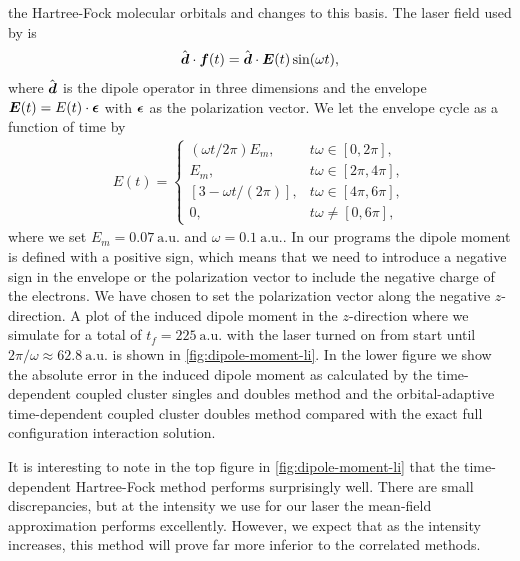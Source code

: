             the Hartree-Fock molecular orbitals and changes to this basis.
            The laser field used by \citeauthor{li_2005} is
            \begin{align}
                \hat{\boldsymbol{d}} \cdot \boldsymbol{f}(t)
                = \hat{\boldsymbol{d}} \cdot \boldsymbol{E}(t)\sin(\omega t),
            \end{align}
            where $\hat{\boldsymbol{d}}$ is the dipole operator in three dimensions and
            the envelope $\boldsymbol{E}(t) = E(t) \cdot \boldsymbol{\epsilon}$ with
            $\boldsymbol{\epsilon}$ as the polarization vector.
            We let the envelope cycle as a function of time by
            \begin{align}
                E(t) = \begin{cases}
                    (\omega t / 2\pi) E_m, & t\omega \in [0, 2\pi], \\
                    E_m, & t\omega \in [2\pi, 4\pi], \\
                    [3 - \omega t / (2\pi)], & t\omega \in [4\pi, 6\pi], \\
                    0, & t\omega \neq [0, 6\pi],
                \end{cases}
            \end{align}
            where we set $E_m = \SI{0.07}{\text{a.u.}}$ and $\omega =
            \SI{0.1}{\text{a.u.}}$.
            In our programs the dipole moment is defined with a positive sign,
            which means that we need to introduce a negative sign in the
            envelope or the polarization vector to include the negative charge
            of the electrons.
            We have chosen to set the polarization vector along the negative
            $z$-direction.
            A plot of the induced dipole moment in the $z$-direction where we
            simulate for a total of $t_f = \SI{225}{\text{a.u.}}$ with the laser
            turned on from start until $2\pi/\omega \approx
            \SI{62.8}{\text{a.u.}}$ is shown in \autoref{fig:dipole-moment-li}.
            In the lower figure we show the absolute error in the induced dipole
            moment as calculated by the time-dependent coupled cluster singles
            and doubles method and the orbital-adaptive time-dependent coupled
            cluster doubles method compared with the exact full configuration
            interaction solution.

            It is interesting to note in the top figure in
            \autoref{fig:dipole-moment-li} that the time-dependent Hartree-Fock
            method performs surprisingly well.
            There are small discrepancies, but at the intensity we use for our
            laser the mean-field approximation performs excellently.
            However, we expect that as the intensity increases, this method will
            prove far more inferior to the correlated methods.

